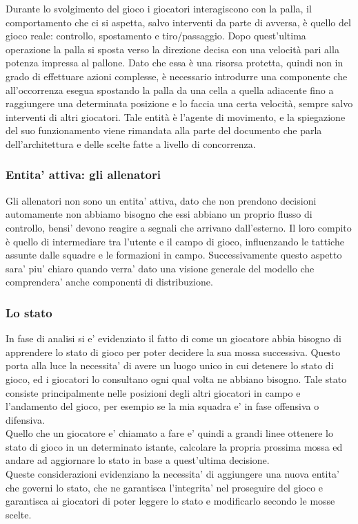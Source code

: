 Durante lo svolgimento del gioco i giocatori interagiscono con la palla, il comportamento che ci si aspetta, salvo interventi da parte di avversa, è quello del gioco reale: controllo, spostamento e tiro/passaggio. Dopo quest’ultima operazione la palla si sposta verso la direzione decisa con una velocità pari alla potenza impressa al pallone. Dato che essa è una risorsa protetta, quindi non in grado di effettuare azioni complesse, è necessario introdurre una componente che all’occorrenza esegua spostando la palla da una cella a quella adiacente fino a raggiungere una determinata posizione e lo faccia una certa velocità, sempre salvo interventi di altri giocatori. Tale entità è l’agente di movimento, e la spiegazione del suo funzionamento viene rimandata alla parte del documento che parla dell’architettura e delle scelte fatte a livello di concorrenza.

\subsubsection{Entita' attiva: gli allenatori}
\label{sec:entita_coinvolte_allenatori}

Gli allenatori non sono un entita’ attiva, dato che non prendono decisioni automamente non abbiamo bisogno che essi abbiano un proprio flusso di controllo, bensi’ devono reagire a segnali che arrivano dall’esterno. Il loro compito è quello di intermediare tra l’utente e il campo di gioco, influenzando le tattiche assunte dalle squadre e le formazioni in campo. Successivamente questo aspetto sara’ piu’ chiaro quando verra’ dato una visione generale del modello che comprendera’ anche componenti di distribuzione. 

\subsubsection{Lo stato}
\label{sec:entita_coinvolte_stato}

In fase di analisi si e' evidenziato il fatto di come un giocatore abbia bisogno di apprendere lo stato di gioco per poter decidere la sua mossa successiva. Questo porta alla luce la necessita' di avere un luogo unico in cui detenere lo stato di gioco, ed i giocatori lo consultano ogni qual volta ne abbiano bisogno. Tale stato consiste principalmente nelle posizioni degli altri giocatori in campo e l'andamento del gioco, per esempio se la mia squadra e' in fase offensiva o difensiva.\\

Quello che un giocatore e' chiamato a fare e' quindi a grandi linee ottenere lo stato di gioco in un determinato istante, calcolare la propria prossima mossa ed andare ad aggiornare lo stato in base a quest'ultima decisione.\\

Queste considerazioni evidenziano la necessita' di aggiungere una nuova entita' che governi lo stato, che ne garantisca l'integrita' nel proseguire del gioco e garantisca ai giocatori di poter leggere lo stato e modificarlo secondo le mosse scelte.
